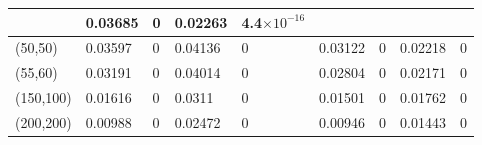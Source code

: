 \documentclass[10pt,twosided]{article}
\numberwithin{equation}{section}
\numberwithin{equation}{section}
\begin{document}
\begin{table}
\begin{tabular}{|p{41pt}|p{32pt}|p{38pt}|p{32pt}|p{38pt}|p{32pt}|p{38pt}|p{32pt}|p{38pt}|}
{} & \parbox{32pt}{\raggedright
0.03685
} & \parbox{38pt}{\raggedright
0
} & \parbox{32pt}{\raggedright
0.02263
} & \parbox{38pt}{\raggedright
\small{4.4$\times10^{-16}$}
} \\
\hline
\parbox{41pt}{\raggedright
(50,50)
} & \parbox{32pt}{\raggedright
0.03597
} & \parbox{38pt}{\raggedright
0
} & \parbox{32pt}{\raggedright
0.04136
} & \parbox{38pt}{\raggedright
0
} & \parbox{32pt}{\raggedright
0.03122
} & \parbox{38pt}{\raggedright
0
} & \parbox{32pt}{\raggedright
0.02218
} & \parbox{38pt}{\raggedright
0
} \\
\hline
\parbox{41pt}{\raggedright
(55,60)
} & \parbox{32pt}{\raggedright
0.03191
} & \parbox{38pt}{\raggedright
0
} & \parbox{32pt}{\raggedright
0.04014
} & \parbox{38pt}{\raggedright
0
} & \parbox{32pt}{\raggedright
0.02804
} & \parbox{38pt}{\raggedright
0
} & \parbox{32pt}{\raggedright
0.02171
} & \parbox{38pt}{\raggedright
0
} \\
\hline
\parbox{41pt}{\raggedright
(150,100)
} & \parbox{32pt}{\raggedright
0.01616
} & \parbox{38pt}{\raggedright
0
} & \parbox{32pt}{\raggedright
0.0311
} & \parbox{38pt}{\raggedright
0
} & \parbox{32pt}{\raggedright
0.01501
} & \parbox{38pt}{\raggedright
0
} & \parbox{32pt}{\raggedright
0.01762
} & \parbox{38pt}{\raggedright
0
} \\
\hline
\parbox{41pt}{\raggedright
(200,200)
} & \parbox{32pt}{\raggedright
0.00988
} & \parbox{38pt}{\raggedright
0
} & \parbox{32pt}{\raggedright
0.02472
} & \parbox{38pt}{\raggedright
0
} & \parbox{32pt}{\raggedright
0.00946
} & \parbox{38pt}{\raggedright
0
} & \parbox{32pt}{\raggedright
0.01443
} & \parbox{38pt}{\raggedright
0
} \\
\hline
\end{tabular}
\end{table}
\end{document}
